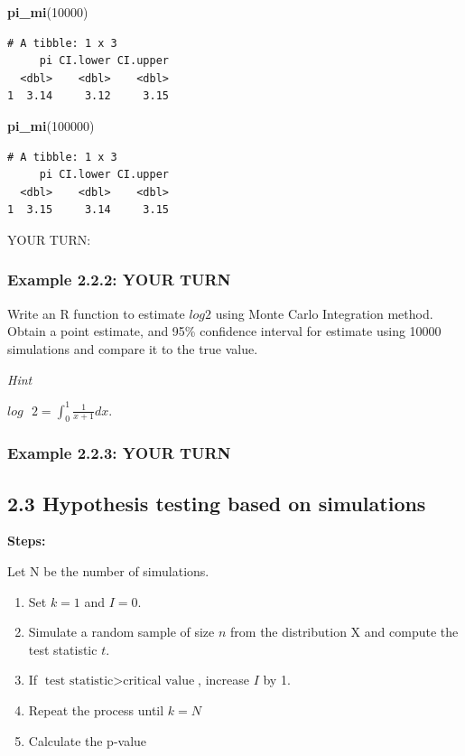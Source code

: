 \documentclass[]{article}
\newenvironment{Shaded}{\begin{snugshade}}{\end{snugshade}}
\newcommand{\DecValTok}[1]{\textcolor[rgb]{0.00,0.00,0.81}{#1}}
\newcommand{\KeywordTok}[1]{\textcolor[rgb]{0.13,0.29,0.53}{\textbf{#1}}}
\newcommand{\NormalTok}[1]{#1}
\begin{document}
\begin{Shaded}
\begin{Highlighting}[]
\KeywordTok{pi_mi}\NormalTok{(}\DecValTok{10000}\NormalTok{)}
\end{Highlighting}
\end{Shaded}

\begin{verbatim}
# A tibble: 1 x 3
     pi CI.lower CI.upper
  <dbl>    <dbl>    <dbl>
1  3.14     3.12     3.15
\end{verbatim}

\begin{Shaded}
\begin{Highlighting}[]
\KeywordTok{pi_mi}\NormalTok{(}\DecValTok{100000}\NormalTok{)}
\end{Highlighting}
\end{Shaded}

\begin{verbatim}
# A tibble: 1 x 3
     pi CI.lower CI.upper
  <dbl>    <dbl>    <dbl>
1  3.15     3.14     3.15
\end{verbatim}

YOUR TURN:

\hypertarget{example-2.2.2-your-turn}{%
\subsubsection{Example 2.2.2: YOUR TURN}\label{example-2.2.2-your-turn}}

Write an R function to estimate \(log 2\) using Monte Carlo Integration
method. Obtain a point estimate, and 95\% confidence interval for
estimate using 10000 simulations and compare it to the true value.

\emph{Hint}

\(log \text{ }2 = \int_0^1\frac{1}{x+1}dx.\)

\hypertarget{example-2.2.3-your-turn}{%
\subsubsection{Example 2.2.3: YOUR TURN}\label{example-2.2.3-your-turn}}

\hypertarget{hypothesis-testing-based-on-simulations}{%
\subsection{2.3 Hypothesis testing based on
simulations}\label{hypothesis-testing-based-on-simulations}}

\textbf{Steps: }

Let N be the number of simulations.

\begin{enumerate}
\def\labelenumi{\arabic{enumi}.}
\item
  Set \(k=1\) and \(I = 0\).
\item
  Simulate a random sample of size \(n\) from the distribution X and
  compute the test statistic \(t\).
\item
  If \(\text{test statistic} > \text{critical value}\), increase \(I\)
  by 1.
\item
  Repeat the process until \(k=N\)
\item
  Calculate the p-value
\end{enumerate}
\end{document}
